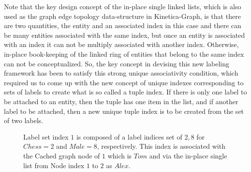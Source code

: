 \documentclass[preprint,3p,twocolumn]{elsarticle}
\begin{document}
Note that the key design concept of the in-place single linked lists, which is also used as the graph edge topology data-structure in Kinetica-Graph, is that there are two quantities, the entity and an associated index in this case and there can be many entities associated with the same index, but once an entity is associated with an index it can not be multiply associated with another index. Otherwise, in-place book-keeping of the linked ring of entities that belong to the same index can not be conceptualized. So, the key concept in devising this new labeling framework has been to satisfy this strong unique associativity condition, which required us to come up with the new concept of unique indexes corresponding to sets of labels to create what is so called a tuple index. If there is only one label to be attached to an entity, then the tuple has one item in the list, and if another label to be attached, then a new unique tuple index is to be created from the set of two labels. 

\begin{figure}
\centering
    \caption{Label set index $1$ is composed of a label indices set of ${2,8}$ for $Chess=2$ and $Male=8$, respectively. This index is associated with the Cached graph node of $1$ which is $Tom$ and via the in-place single list from Node index $1$ to $2$ as $Alex$.}
    \label{Figure:labelnode}
\end{figure}
\end{document}
